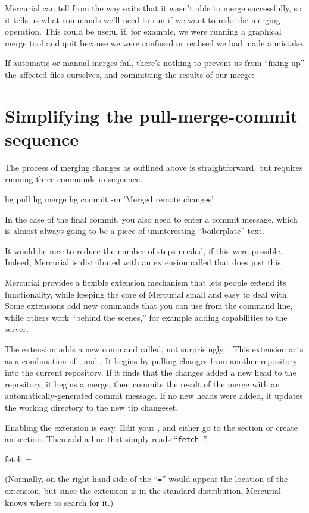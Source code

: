 Mercurial can tell from the way  exits that it wasn't
able to merge successfully, so it tells us what commands we'll need to
run if we want to redo the merging operation.  This could be useful
if, for example, we were running a graphical merge tool and quit
because we were confused or realised we had made a mistake.

If automatic or manual merges fail, there's nothing to prevent us from
``fixing up'' the affected files ourselves, and committing the results
of our merge:

\section{Simplifying the pull-merge-commit sequence}
\label{sec:tour-merge:fetch}

The process of merging changes as outlined above is straightforward,
but requires running three commands in sequence.
\begin{codesample2}
  hg pull
  hg merge
  hg commit -m 'Merged remote changes'
\end{codesample2}
In the case of the final commit, you also need to enter a commit
message, which is almost always going to be a piece of uninteresting
``boilerplate'' text.

It would be nice to reduce the number of steps needed, if this were
possible.  Indeed, Mercurial is distributed with an extension called
 that does just this.

Mercurial provides a flexible extension mechanism that lets people
extend its functionality, while keeping the core of Mercurial small
and easy to deal with.  Some extensions add new commands that you can
use from the command line, while others work ``behind the scenes,''
for example adding capabilities to the server.

The  extension adds a new command called, not
surprisingly, .  This extension acts as a combination of
,  and .  It begins by pulling
changes from another repository into the current repository.  If it
finds that the changes added a new head to the repository, it begins a
merge, then commits the result of the merge with an
automatically-generated commit message.  If no new heads were added,
it updates the working directory to the new tip changeset.

Enabling the  extension is easy.  Edit your
, and either go to the  section
or create an  section.  Then add a line that
simply reads ``\Verb+fetch +''.
\begin{codesample2}
  [extensions]
  fetch =
\end{codesample2}
(Normally, on the right-hand side of the ``\texttt{=}'' would appear
the location of the extension, but since the  extension
is in the standard distribution, Mercurial knows where to search for
it.)

